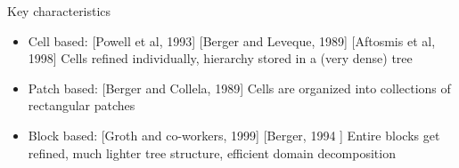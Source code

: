 \documentclass{beamer}
\begin{document}
\begin{frame}
\begin{minipage}[t][1\textheight]{1\textwidth}
\begin{exampleblock}{Key characteristics}
\begin{figure}
\end{figure}

\vspace{-15pt}
\begin{itemize}
\tiny
\item Cell based: [Powell et al, 1993] [Berger and Leveque, 1989] [Aftosmis et al, 1998] \newline Cells refined individually, hierarchy stored in a (very dense) tree

\item Patch based: [Berger and Collela, 1989] \newline Cells are organized into collections of rectangular patches

\item Block based:  [Groth and co-workers, 1999] [Berger, 1994 ] \newline Entire blocks get refined, much lighter tree structure, efficient domain decomposition
\end{itemize}
\end{exampleblock}
\end{minipage}

\end{frame}
\end{document}
